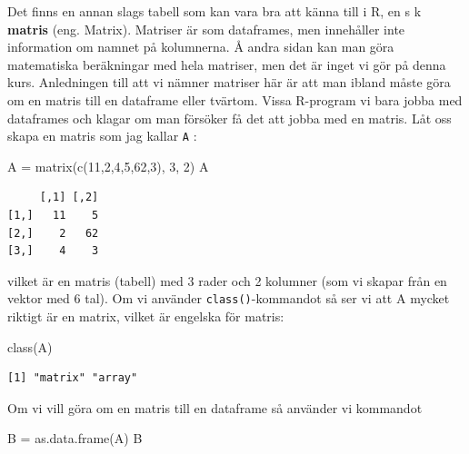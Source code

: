 \documentclass[
  letterpaper,
  DIV=11,
  numbers=noendperiod,
  oneside]{scrartcl}
\newenvironment{Shaded}{\begin{snugshade}}{\end{snugshade}}
\newcommand{\DecValTok}[1]{\textcolor[rgb]{0.68,0.00,0.00}{#1}}
\newcommand{\FunctionTok}[1]{\textcolor[rgb]{0.28,0.35,0.67}{#1}}
\newcommand{\NormalTok}[1]{\textcolor[rgb]{0.00,0.23,0.31}{#1}}
\newcommand{\OtherTok}[1]{\textcolor[rgb]{0.00,0.23,0.31}{#1}}
\begin{document}
Det finns en annan slags tabell som kan vara bra att känna till i R, en
s k \textbf{matris} (eng. Matrix). Matriser är som dataframes, men
innehåller inte information om namnet på kolumnerna. Å andra sidan kan
man göra matematiska beräkningar med hela matriser, men det är inget vi
gör på denna kurs. Anledningen till att vi nämner matriser här är att
man ibland måste göra om en matris till en dataframe eller tvärtom.
Vissa R-program vi bara jobba med dataframes och klagar om man försöker
få det att jobba med en matris. Låt oss skapa en matris som jag kallar
\texttt{A} :

\begin{Shaded}
\begin{Highlighting}[]
\NormalTok{A }\OtherTok{=} \FunctionTok{matrix}\NormalTok{(}\FunctionTok{c}\NormalTok{(}\DecValTok{11}\NormalTok{,}\DecValTok{2}\NormalTok{,}\DecValTok{4}\NormalTok{,}\DecValTok{5}\NormalTok{,}\DecValTok{62}\NormalTok{,}\DecValTok{3}\NormalTok{), }\DecValTok{3}\NormalTok{, }\DecValTok{2}\NormalTok{)}
\NormalTok{A}
\end{Highlighting}
\end{Shaded}

\begin{verbatim}
     [,1] [,2]
[1,]   11    5
[2,]    2   62
[3,]    4    3
\end{verbatim}

vilket är en matris (tabell) med 3 rader och 2 kolumner (som vi skapar
från en vektor med 6 tal). Om vi använder \texttt{class()}-kommandot så
ser vi att A mycket riktigt är en matrix, vilket är engelska för matris:

\begin{Shaded}
\begin{Highlighting}[]
\FunctionTok{class}\NormalTok{(A)}
\end{Highlighting}
\end{Shaded}

\begin{verbatim}
[1] "matrix" "array" 
\end{verbatim}

Om vi vill göra om en matris till en dataframe så använder vi kommandot

\begin{Shaded}
\begin{Highlighting}[]
\NormalTok{B }\OtherTok{=} \FunctionTok{as.data.frame}\NormalTok{(A)}
\NormalTok{B}
\end{Highlighting}
\end{Shaded}
\end{document}
